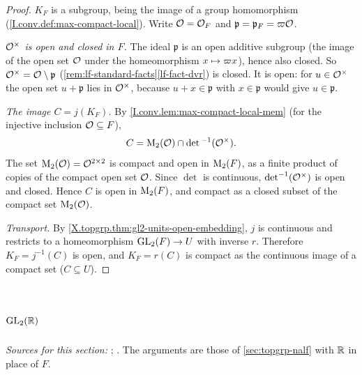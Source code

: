 \begin{theorem}
\end{theorem}
\begin{proof}
$K_F$ is a subgroup, being the image of a group homomorphism (\cref{I.conv.def:max-compact-local}). Write
$\mathcal{O}=\mathcal{O}_F$ and $\mathfrak p=\mathfrak p_F=\varpi\mathcal{O}$.

\emph{$\mathcal{O}^\times$ is open and closed in $F$.} The ideal $\mathfrak p$ is an open additive subgroup (the image of
the open set $\mathcal{O}$ under the homeomorphism $x\mapsto\varpi x$), hence also closed. So
$\mathcal{O}^\times=\mathcal{O}\setminus\mathfrak p$ (\cref{rem:lf-standard-facts}\ref{lf-fact-dvr}) is closed. It is open: for
$u\in\mathcal{O}^\times$ the open set $u+\mathfrak p$ lies in $\mathcal{O}^\times$, because $u+x\in\mathfrak p$ with
$x\in\mathfrak p$ would give $u\in\mathfrak p$.

\emph{The image $C=j(K_F)$.} By \cref{I.conv.lem:max-compact-local-mem} (for the injective inclusion
$\mathcal{O}\subseteq F$),
\[
  C=\mathrm{M}_2(\mathcal{O})\cap\det{}^{-1}(\mathcal{O}^\times).
\]
The set $\mathrm{M}_2(\mathcal{O})=\mathcal{O}^{2\times2}$ is compact and open in $\mathrm{M}_2(F)$, as a finite product of copies of the
compact open set $\mathcal{O}$. Since $\det$ is continuous, $\det^{-1}(\mathcal{O}^\times)$ is open and closed. Hence $C$ is open
in $\mathrm{M}_2(F)$, and compact as a closed subset of the compact set $\mathrm{M}_2(\mathcal{O})$.

\emph{Transport.} By \cref{X.topgrp.thm:gl2-units-open-embedding}, $j$ is continuous and restricts to a homeomorphism
$\mathrm{GL}_2(F)\to U$ with inverse $r$. Therefore $K_F=j^{-1}(C)$ is open, and $K_F=r(C)$ is compact as the continuous
image of a compact set ($C\subseteq U$).
\end{proof}

\section{\texorpdfstring{$\mathrm{GL}_2(\mathbb{R})$}{GL₂(ℝ)}}\label{sec:topgrp-real}

\noindent\emph{Sources for this section:} \cite[§5]{JL}; \cite[§2]{AIntro}. The arguments are those of
\cref{sec:topgrp-nalf} with $\mathbb{R}$ in place of $F$.

